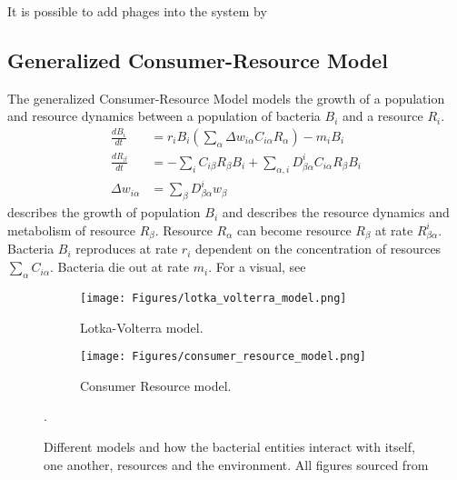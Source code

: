 It is possible to add phages into the system by 
 
\subsection{Generalized Consumer-Resource Model}
The generalized Consumer-Resource Model models the growth of a population and resource dynamics between a population of bacteria ${B}_i$ and a resource ${R}_i$. 
\begin{align}
    \frac{d{B}_i}{dt} &= r_i{B}_i \left(\sum_{\alpha} \Delta w_{i \alpha}C_{i \alpha}R_{\alpha}\right) - m_i {B}_i \label{eq:generalized_consumer_resource_model_1}\\
    \frac{dR_{\beta}}{dt} &= -\sum_i C_{i\beta}R_{\beta}{B_i} + \sum_{\alpha, i}D_{\beta\alpha}^{i}C_{i\alpha}R_{\beta}{B}_i \label{eq:generalized_consumer_resource_model_2}\\
    \Delta w_{i\alpha} &= \sum_{\beta}D_{\beta \alpha}^{i}w_{\beta} \nonumber
\end{align}
 describes the growth of population $B_i$ and  describes the resource dynamics and metabolism of resource $R_\beta$. 
Resource $R_\alpha$ can become resource $R_\beta$ at rate $R_{\beta \alpha}^{i}$. 
Bacteria $B_i$ reproduces at rate $r_i$ dependent on the concentration of resources $\sum_\alpha C_{i\alpha}$. 
Bacteria die out at rate $m_i$. 
For a visual, see 

\begin{figure}[h!]
    \centering
    \begin{subfigure}{0.49\linewidth}
        \centering
        \captionsetup{width=1\linewidth}
        \texttt{[image: Figures/lotka\_volterra\_model.png]}
        \caption{
            Lotka-Volterra model.
        }
        \label{fig:lotka_volterra_model}
    \end{subfigure}
    \hfill
    \begin{subfigure}{0.49\linewidth}
        \centering
        \captionsetup{width=1\linewidth}
        \texttt{[image: Figures/consumer\_resource\_model.png]}
        \caption{
            Consumer Resource model.
        }
        \label{fig:consumer_resource_model}
    \end{subfigure}
    \caption{Different models and how the bacterial entities interact with itself, one another, resources and the environment. All figures sourced from \citet{vandenbergEcologicalModellingApproaches2022}}. 
\end{figure}



